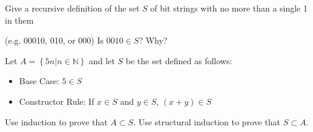 \documentclass[solution, letterpaper]{cs20}
\begin{document}
\subproblem Give a recursive definition of the set $S$ of bit strings with no more than a single 1 in them 

(e.g. 00010, 010, or 000)
\subproblem Is $0010\in S$? Why?

Let $A = \left\{ {5n|n\in\mathbb{N}}\right\}$ and let $S$ be the set defined as follows:
\begin{itemize}
\item Base Case: $5 \in S$
\item Constructor Rule: If $x\in S$ and $y\in S$, $(x+y) \in S$ 
\end{itemize}
\subproblem Use induction to prove that $A\subset S $.
\subproblem Use structural induction to prove that $S\subset A$.
\end{document}
